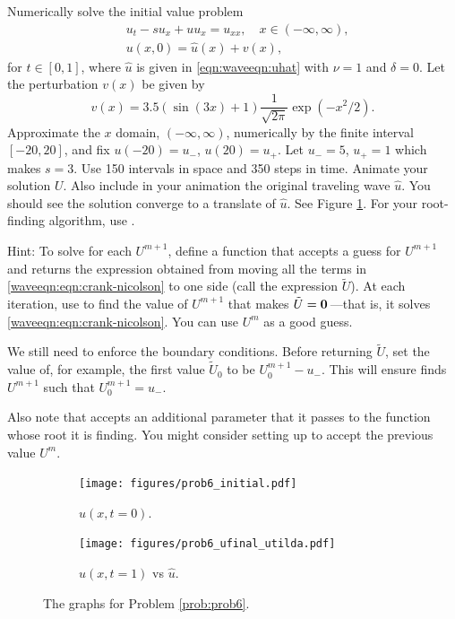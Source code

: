 \begin{problem}
\label{prob:prob6}
Numerically solve the initial value problem
\begin{align*}
	&{ } u_t -su_x + uu_x = u_{xx}, \quad x \in (-\infty,\infty),\\
	&{ } u(x,0) = \hat{u}(x)+v(x),
\end{align*}
for $t \in [0,1]$, where $\hat{u}$ is given in \eqref{eqn:waveeqn:uhat} with $\nu=1$ and $\delta=0$.
Let the perturbation $v(x)$ be given by
\[v(x) = 3.5(\sin{(3x)} + 1)\frac{1}{\sqrt{2\pi}} \exp{(-x^2/2)}.\]
Approximate the $x$ domain, $(-\infty, \infty)$, numerically by the finite interval $[-20,20]$, and fix $u(-20) = u_-$, $u(20) = u_+$.
Let $u_- = 5$, $u_+ = 1$ which makes $s = 3$.
Use 150 intervals in space and 350 steps in time.
Animate your solution $U$.
Also include in your animation the original traveling wave $\hat u$.
You should see the solution converge to a translate of $\hat{u}$.
See Figure \ref{fig:prob6}.
For your root-finding algorithm, use .

Hint:
To solve for each $U^{m+1}$, define a function  that accepts a guess for $U^{m+1}$ and returns the expression obtained from moving all the terms in \eqref{waveeqn:eqn:crank-nicolson} to one side (call the expression $\tilde U$).
At each iteration, use  to find the value of $U^{m+1}$ that makes $\tilde U = \mathbf{0}\,$---that is, it solves \eqref{waveeqn:eqn:crank-nicolson}.
You can use $U^m$ as a good guess.

We still need to enforce the boundary conditions.
Before returning $\tilde U$, set the value of, for example, the first value $\tilde U_0$ to be $U^{m+1}_0 - u_-$. This will ensure  finds $U^{m+1}$ such that $U^{m+1}_0 = u_-$.

Also note that  accepts an additional parameter  that it passes to the function whose root it is finding.
You might consider setting up  to accept the previous value $U^m$.

\begin{figure}[H]
\centering
\begin{subfigure}{.49\textwidth}
\centering
\texttt{[image: figures/prob6\_initial.pdf]}
\caption{$u(x,t=0)$.}
\end{subfigure}
%
\begin{subfigure}{.49\textwidth}
\centering
\texttt{[image: figures/prob6\_ufinal\_utilda.pdf]}
\caption{$u(x,t = 1)$ vs $\hat{u}$.}
\end{subfigure}
\caption{The graphs for Problem \ref{prob:prob6}.}
\label{fig:prob6}
\end{figure}
\end{problem}

